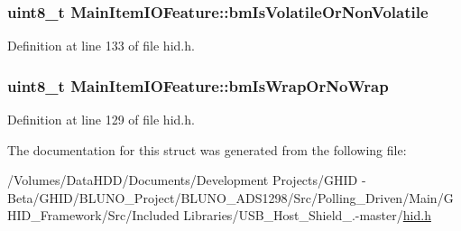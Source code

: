 \hypertarget{struct_main_item_i_o_feature_aaa20e71b24fe2de818a85b0cbdcba33e}{
\subsubsection[{bm\-Is\-Volatile\-Or\-Non\-Volatile}]{\setlength{\rightskip}{0pt plus 5cm}uint8\-\_\-t {\bf \-Main\-Item\-I\-O\-Feature\-::bm\-Is\-Volatile\-Or\-Non\-Volatile}}}\label{struct_main_item_i_o_feature_aaa20e71b24fe2de818a85b0cbdcba33e}


\-Definition at line 133 of file hid.\-h.

\hypertarget{struct_main_item_i_o_feature_a7acdfbb4a6b53046205cccae67fa26d4}{
\subsubsection[{bm\-Is\-Wrap\-Or\-No\-Wrap}]{\setlength{\rightskip}{0pt plus 5cm}uint8\-\_\-t {\bf \-Main\-Item\-I\-O\-Feature\-::bm\-Is\-Wrap\-Or\-No\-Wrap}}}\label{struct_main_item_i_o_feature_a7acdfbb4a6b53046205cccae67fa26d4}


\-Definition at line 129 of file hid.\-h.



\-The documentation for this struct was generated from the following file\-:\begin{DoxyCompactItemize}
\item 
/\-Volumes/\-Data\-H\-D\-D/\-Documents/\-Development Projects/\-G\-H\-I\-D -\/ Beta/\-G\-H\-I\-D/\-B\-L\-U\-N\-O\-\_\-\-Project/\-B\-L\-U\-N\-O\-\_\-\-A\-D\-S1298/\-Src/\-Polling\-\_\-\-Driven/\-Main/\-G\-H\-I\-D\-\_\-\-Framework/\-Src/\-Included Libraries/\-U\-S\-B\-\_\-\-Host\-\_\-\-Shield\-\_.-\/master/\hyperlink{hid_8h}{hid.\-h}\end{DoxyCompactItemize}
